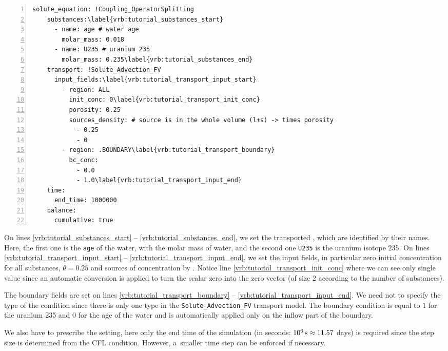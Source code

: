 \begin{Verbatim}[numbers=left, firstnumber=last,commandchars=\\\{\}]
  solute_equation: !Coupling_OperatorSplitting
    substances:\label{vrb:tutorial_substances_start}
      - name: age # water age
        molar_mass: 0.018
      - name: U235 # uranium 235
        molar_mass: 0.235\label{vrb:tutorial_substances_end}
    transport: !Solute_Advection_FV
      input_fields:\label{vrb:tutorial_transport_input_start}
        - region: ALL
          init_conc: 0\label{vrb:tutorial_transport_init_conc}
          porosity: 0.25
          sources_density: # source is in the whole volume (l+s) -> times porosity
            - 0.25
            - 0
        - region: .BOUNDARY\label{vrb:tutorial_transport_boundary}
          bc_conc:
            - 0.0
            - 1.0\label{vrb:tutorial_transport_input_end}
    time:
      end_time: 1000000
    balance:
      cumulative: true
\end{Verbatim}

On lines \ref{vrb:tutorial_substances_start} -- \ref{vrb:tutorial_substances_end}, we set the transported , 
which are identified by their names. Here, the first one is the \verb'age' of the water, with the molar mass of water, 
and the second one \verb'U235' is the uranium isotope 235. 
On lines \ref{vrb:tutorial_transport_input_start} -- \ref{vrb:tutorial_transport_input_end}, we set the input fields, in particular zero initial concentration for all substances,
 $\theta = 0.25$ and 
sources of concentration by . 
Notice line \ref{vrb:tutorial_transport_init_conc} where we can see only single value since an automatic conversion is applied to turn the scalar 
zero into the zero vector (of size 2 according to the number of substances). 

The boundary fields are set on lines \ref{vrb:tutorial_transport_boundary} -- \ref{vrb:tutorial_transport_input_end}. We need not to specify the type of the condition since there is 
only one type in the {\tt Solute\_Advection\_FV} transport model. The boundary condition is equal to $1$ for the uranium 235 and $0$ 
for the age of the water and is automatically applied only on the inflow part of the boundary. 

We also have to prescribe the  setting, here only the end time of the simulation
(in seconds: $10^6\,\rm{s}\approx 11.57$ days) is required since the step size is determined from the CFL condition. 
However, a~smaller time step can be enforced if necessary.

